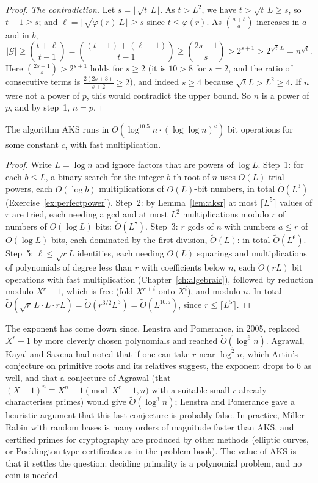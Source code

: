 \begin{proof}
\emph{The contradiction.} Let $s=\lfloor\sqrt t\,L\rfloor$. As $t>L^2$, we have $t>\sqrt t\,L\ge s$, so $t-1\ge s$; and $\ell=\lfloor\sqrt{\varphi(r)}\,L\rfloor\ge s$ since $t\le\varphi(r)$. As $\binom{a+b}{a}$ increases in $a$ and in $b$,
\[
|\mathcal G|\ge\binom{t+\ell}{t-1}=\binom{(t-1)+(\ell+1)}{t-1}\ge\binom{2s+1}{s}>2^{s+1}>2^{\sqrt t\,L}=n^{\sqrt t}.
\]
Here $\binom{2s+1}s>2^{s+1}$ holds for $s\ge2$ (it is $10>8$ for $s=2$, and the ratio of consecutive terms is $\frac{2(2s+3)}{s+2}\ge2$), and indeed $s\ge4$ because $\sqrt tL>L^2\ge4$. If $n$ were not a power of $p$, this would contradict the upper bound. So $n$ is a power of $p$, and by step~1, $n=p$.
\end{proof}

\begin{proposition}\label{prop:akstime}
The algorithm AKS runs in $O(\log^{10.5}n\cdot(\log\log n)^c)$ bit operations for some constant $c$, with fast multiplication.
\end{proposition}
\begin{proof}
Write $L=\log n$ and ignore factors that are powers of $\log L$. Step~1: for each $b\le L$, a binary search for the integer $b$-th root of $n$ uses $O(L)$ trial powers, each $O(\log b)$ multiplications of $O(L)$-bit numbers, in total $\tilde O(L^3)$ (Exercise~\ref{ex:perfectpower}). Step~2: by Lemma~\ref{lem:aksr} at most $\lceil L^5\rceil$ values of $r$ are tried, each needing a gcd and at most $L^2$ multiplications modulo $r$ of numbers of $O(\log L)$ bits: $\tilde O(L^7)$.
Step~3: $r$ gcds of $n$ with numbers $a\le r$ of $O(\log L)$ bits, each dominated by the first division, $\tilde O(L)$: in total $\tilde O(L^6)$. Step~5: $\ell\le\sqrt rL$ identities, each needing $O(L)$ squarings and multiplications of polynomials of degree less than $r$ with coefficients below $n$, each $\tilde O(rL)$ bit operations with fast multiplication (Chapter~\ref{ch:algebraic}), followed by reduction modulo $X^r-1$, which is free (fold $X^{r+i}$ onto $X^i$), and modulo $n$.
In total $\tilde O(\sqrt r\,L\cdot L\cdot rL)=\tilde O(r^{3/2}L^3)=\tilde O(L^{10.5})$, since $r\le\lceil L^5\rceil$.
\end{proof}

The exponent has come down since. Lenstra and Pomerance, in 2005, replaced $X^r-1$ by more cleverly chosen polynomials and reached $\tilde O(\log^6n)$. Agrawal, Kayal and Saxena had noted that if one can take $r$ near $\log^2 n$, which Artin's conjecture on primitive roots and its relatives suggest, the exponent drops to $6$ as well, and that a conjecture of Agrawal (that $(X-1)^n\equiv X^n-1\pmod{X^r-1,n}$ with a suitable small $r$ already characterises primes)
would give $\tilde O(\log^3n)$; Lenstra and Pomerance gave a heuristic argument that this last conjecture is probably false. In practice, Miller--Rabin with random bases is many orders of magnitude faster than AKS, and certified primes for cryptography are produced by other methods (elliptic curves, or Pocklington-type certificates as in the problem book). The value of AKS is that it settles the question: deciding primality is a polynomial problem, and no coin is needed.

